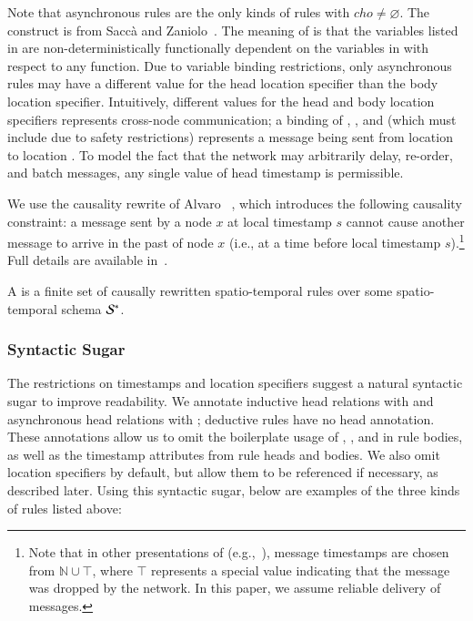 Note that asynchronous rules are the only kinds of rules with $cho \neq \varnothing$.
The  construct is from Sacc\`{a} and Zaniolo~\cite{sacca-zaniolo}.
The meaning of  is that the variables listed
in  are non-deterministically functionally dependent on the variables in  with respect to
any function.  Due to variable binding restrictions, only asynchronous rules may
have a different value for the head location specifier than the body location
specifier.  Intuitively, different values for the head and body location specifiers represents
cross-node communication; a binding of , , and 
(which must include  due to safety restrictions) represents a message
being sent from location  to location .  To model the fact
that the network may arbitrarily delay, re-order, and batch messages, any single
value of head timestamp  is permissible.

We use the causality rewrite of Alvaro \etal~\cite{ameloot-operational}, which introduces the following causality constraint: a message sent by a node $x$ at local timestamp $s$ cannot cause another message to arrive in the past of node $x$ (i.e., at a time before local timestamp $s$).\footnote{Note that in
  other presentations of \lang (e.g.,~\cite{dedalus}), message timestamps are
  chosen from $\mathbb{N} \cup \top$, where $\top$ represents a special value
  indicating that the message was dropped by the network. In this paper, we
  assume reliable delivery of messages.}  Full details are available in~\cite{ameloot-operational}.

A  is a finite set of causally rewritten spatio-temporal rules over some spatio-temporal schema $\stschema$.  

\subsubsection{Syntactic Sugar}
The restrictions on timestamps and location specifiers suggest a natural
syntactic sugar to improve readability.  We annotate inductive head relations
with  and asynchronous head relations with ;
deductive rules have no head annotation.  These annotations allow us to omit the
boilerplate usage of , ,  and
 in rule bodies, as well as the timestamp attributes from rule
heads and bodies.  We also omit location specifiers by default, but allow them to be referenced if necessary, as described later.  Using this syntactic sugar, below are examples of the three kinds of rules listed above:

